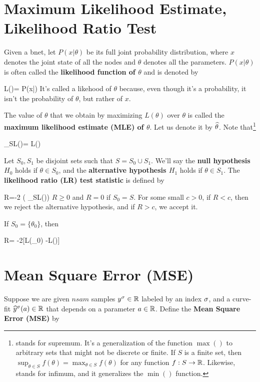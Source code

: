 \section{Maximum Likelihood Estimate,
Likelihood Ratio Test}
\label{sec-likelihood-ratio}

Given a bnet, let $P(x|\theta)$
be its full joint probability distribution,
where
$x$ denotes the joint state
of all the nodes and $\theta$
denotes all the parameters.
 $P(x|\theta)$ is often
called the {\bf likelihood function of $\theta$}
and is denoted by

\beq
L(\theta)= P(x|\theta)
\eeq
It's called a likehood of $\theta$
because, even though it's a probability,
it isn't the probability of $\theta$,
but rather of $x$.

The value of $\theta$
that we obtain by maximizing $L(\theta)$
over $\theta$ is called
the
{\bf maximum likelihood
estimate (MLE) of $\theta$}. Let us denote it by
${\widehat{\theta}}$. Note that\footnote{ stands for supremum.
It's a generalization of the function $\max()$
to arbitrary sets
that might not be discrete or finite.
If $S$ is a
finite set,
then $\sup_{\theta\in S} f(\theta)=
\max_{\theta\in S} f(\theta)$
for any function $f:S\rightarrow { \mathbb{R}}$.
Likewise,  stands for infimum,
and it generalizes the $\min()$ function.}

\beq
\sup_{\theta\in S}L(\theta)=
L(\HAT{\theta})
\eeq


Let $S_0, S_1$ be disjoint sets such that
 $S=S_0\cup S_1$.
We'll say
the {\bf null hypothesis $H_0$} holds
 if $\theta\in S_0$,
and the {\bf alternative hypothesis $H_1$}
holds if
$\theta\in S_1$.
The {\bf likelihood ratio (LR) test statistic}
is defined by


\beq
R=-2\ln
\left(
{\sup_{\theta\in S}L(\theta)}\right)
\eeq
$R\geq 0$ and $R=0$ if  $S_0=S$.
For some small $c>0$,
if $R<c$, then we reject the alternative hypothesis,
and if $R>c$, we accept it.




If $S_0=\{\theta_0\}$,
then

\beq
R= -2[\ln L(\theta_0) -\ln L(\HAT{\theta})]
\eeq


\section{Mean Square Error (MSE)}

Suppose we are
given $nsam$ samples $y^\sigma\in{ \mathbb{R}}$
labeled by an index $\sigma$,
and a curve-fit ${\widehat{y}}^\sigma(a)\in{ \mathbb{R}}$
that depends on a parameter $a\in{ \mathbb{R}}$.
Define the {\bf Mean Square
Error (MSE)}
by

